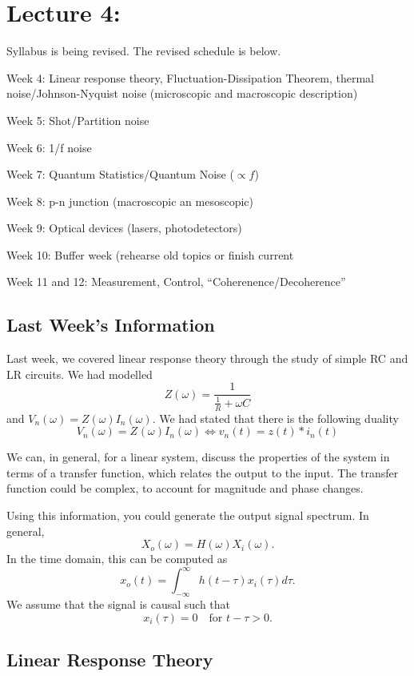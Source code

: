 \documentclass{article}
\begin{document}
\section{Lecture 4: }
Syllabus is being revised. The revised schedule is below.

Week 4: Linear response theory, Fluctuation-Dissipation Theorem,
   thermal noise/Johnson-Nyquist noise (microscopic and macroscopic description)

Week 5: Shot/Partition noise

Week 6: 1/f noise

Week 7: Quantum Statistics/Quantum Noise ($ \propto f $)

Week 8: p-n junction (macroscopic an mesoscopic)

Week 9: Optical devices (lasers, photodetectors)

Week 10: Buffer week (rehearse old topics or finish current

Week 11 and 12: Measurement, Control, ``Coherenence/Decoherence''
\label{sec:lecture_4_}

\subsection{Last Week's Information}
\label{sub:last_week_s_information}

Last week, we covered linear response theory through the study of simple RC and
LR circuits. We had modelled
\[
   Z(\omega) = \frac{1}{\frac{1}{R}+ \omega C}
\]
and $ V_{n}(\omega) = Z(\omega) I_{n}(\omega) $. We had stated that there is the
following duality
\[
   V_{n}(\omega) = Z_{}(\omega) I_{n}(\omega) \Leftrightarrow
   v_{n}(t) = z(t) * i_{n}(t)
\]

We can, in general, for a linear system, discuss the properties of the system in
terms of a transfer function, which relates the output to the input. The
transfer function could be complex, to account for magnitude and phase changes.

Using this information, you could generate the output signal spectrum. In
general,
\[
   X_{o}(\omega) = H(\omega)X_{i}(\omega).
\]
In the time domain, this can be computed as
\[
   x_{o}(t) = \int_{-\infty}^{\infty}h(t-\tau)x_{i}(\tau) d \tau.
\]
We assume that the signal is causal such that
\[
   x_{i}(\tau) = 0 \quad \text{for } t-\tau > 0.
\]

\subsection{Linear Response Theory}
\label{sub:linear_response_theory}
\end{document}
